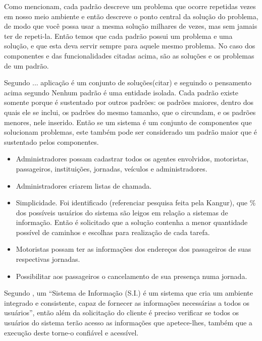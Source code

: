 \documentclass[
	12pt,				%
 	oneside,			%
 	openany,
	a4paper,			%
	english,			%
	french,				%
	spanish,			%
	brazil				%
	]{abntex2}
\begin{document}
Como \cite[p.~XIV]{aPatternLanguage} mencionam, cada padrão descreve um problema que ocorre repetidas vezes em nosso meio ambiente e então descreve o ponto central da solução do problema, de modo que você possa usar a mesma solução milhares de vezes, mas sem jamais ter de repeti-la. Então temos que cada padrão possui um problema e uma solução, e que esta deva servir sempre para aquele mesmo problema. No caso dos componentes e das funcionalidades citadas acima, são as soluções e os problemas de um padrão.

Segundo ... aplicação é um conjunto de soluções(citar) e seguindo o pensamento acima segundo \cite[p.~XVI]{aPatternLanguage} Nenhum padrão é uma entidade isolada. Cada padrão existe somente porque é sustentado por outros padrões: os padrões maiores, dentro dos quais ele se inclui, os padrões do mesmo tamanho, que o circundam, e os padrões menores, nele inserido. Então se um sistema é um conjunto de componentes que solucionam problemas, este também pode ser considerado um padrão maior que é sustentado pelos componentes.


\begin{itemize}
	 \item Administradores possam cadastrar todos os agentes envolvidos, 
	 motoristas, passageiros, instituições, jornadas, veículos e administradores.

	\item Administradores criarem listas de chamada.

	\item Simplicidade. Foi identificado (referenciar pesquisa
	feita pela Kangur), que \% dos possíveis usuários do sistema 
	são leigos em relação a sistemas de informação. Então é 
	solicitado que a solução contenha a menor quantidade possível 
	de caminhos e escolhas para realização de cada tarefa.

	\item Motoristas possam ter as informações dos endereços dos 
	passageiros de suas respectivas jornadas.

	\item Possibilitar aos passageiros o cancelamento de sua presença numa jornada.
\end{itemize}

Segundo \cite[p.~98]{spinolapessoa1998}, um “Sistema de Informação (S.I.) é um
sistema que cria um ambiente integrado e consistente, capaz de fornecer as informações necessárias a todos os usuários”, então além da solicitação do cliente é preciso verificar se todos os usuários do sistema terão acesso as informações que apetece-lhes, também que a execução deste torne-o confiável e acessível.
\end{document}
